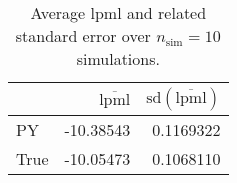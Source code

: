 \begin{table}[H]

\caption{Average lpml and related standard error over $n_{\text{sim}} = 10$ simulations.}
\centering
\begin{tabular}[t]{lrr}
\toprule
  & $\overbar{\text{lpml}}$ & $\text{sd}(\overbar{\text{lpml}})$\\
\midrule
PY & -10.38543 & 0.1169322\\
True & -10.05473 & 0.1068110\\
\bottomrule
\end{tabular}
\end{table}